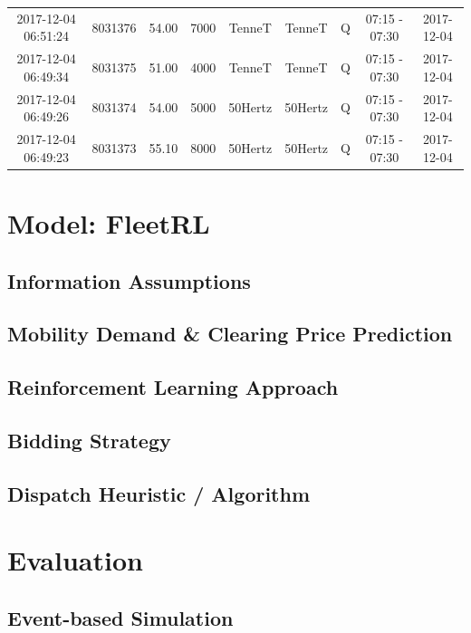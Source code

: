 \documentclass[a4paper, 12pt]{article}
\begin{document}
{\begin{table}
\begin{tabular}{c|cccccccc}
2017-12-04 06:51:24 & 8031376 & 54.00 & 7000 & TenneT & TenneT & Q & 07:15 - 07:30 & 2017-12-04\\
2017-12-04 06:49:34 & 8031375 & 51.00 & 4000 & TenneT & TenneT & Q & 07:15 - 07:30 & 2017-12-04\\
2017-12-04 06:49:26 & 8031374 & 54.00 & 5000 & 50Hertz & 50Hertz & Q & 07:15 - 07:30 & 2017-12-04\\
2017-12-04 06:49:23 & 8031373 & 55.10 & 8000 & 50Hertz & 50Hertz & Q & 07:15 - 07:30 & 2017-12-04\\
\hline
\hline
\end{tabular}
\end{table}
}

\section{Model: FleetRL}
\label{sec:orgfac0a33}
\subsection{Information Assumptions}
\label{sec:org21061ac}
\subsection{Mobility Demand \& Clearing Price Prediction}
\label{sec:org4a6573e}
\subsection{Reinforcement Learning Approach}
\label{sec:orga8924d6}
\subsection{Bidding Strategy}
\label{sec:org4a018c8}




\subsection{Dispatch Heuristic / Algorithm}
\label{sec:org2316c60}

\section{Evaluation}
\label{sec:org6a0fcd4}
\subsection{Event-based Simulation}
\label{sec:orgd87a3f4}
\end{document}
